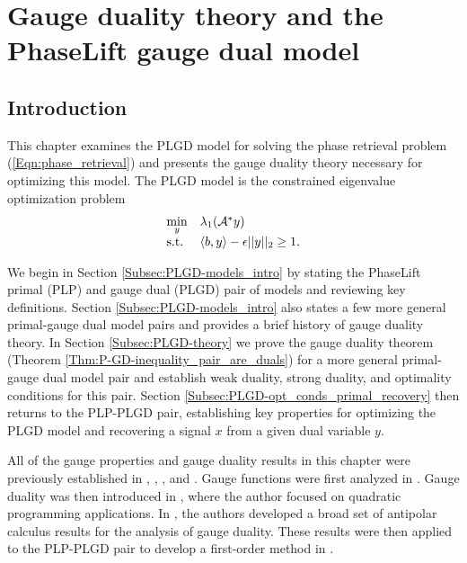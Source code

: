 \chapter{Gauge duality theory and the PhaseLift gauge dual model}	\label{Sec:PLGD}


\section{Introduction} 	\label{Subsec:PLGD-intro}

This chapter examines the PLGD model for solving the phase retrieval problem (\ref{Eqn:phase_retrieval}) and presents the gauge duality theory necessary for optimizing this model.  The PLGD model is the constrained eigenvalue optimization problem
\begin{equation*}
\begin{array}{ll}
	\min\limits_{\substack{y}}
					&	\lambda_1({\mathcal A}^* y)
						\\
	\textnormal{s.t.}
					&	\langle b, y \rangle - \epsilon ||y||_2 \geq 1.
\end{array}
\end{equation*}


We begin in Section \ref{Subsec:PLGD-models_intro} by stating the PhaseLift primal (PLP) and gauge dual (PLGD) pair of models and reviewing key definitions.
Section \ref{Subsec:PLGD-models_intro} also states a few more general primal-gauge dual model pairs and provides a brief history of gauge duality theory.
In Section \ref{Subsec:PLGD-theory} we prove the gauge duality theorem (Theorem \ref{Thm:P-GD-inequality_pair_are_duals}) for a more general primal-gauge dual model pair and establish weak duality, strong duality, and optimality conditions for this pair.
Section \ref{Subsec:PLGD-opt_conds_primal_recovery} then returns to the PLP-PLGD pair, establishing key properties for optimizing the PLGD model and recovering a signal $x$ from a given dual variable $y$.  

All of the gauge properties and gauge duality results in this chapter were previously established in \cite{rockafellar1970convex}, \cite{DBLP:journals/mp/Freund87}, \cite{DBLP:journals/siamjo/FriedlanderMP14}, and \cite{DBLP:journals/siamsc/FriedlanderM16}.  Gauge functions were first analyzed in  \cite{rockafellar1970convex}.  Gauge duality was then introduced in \cite{DBLP:journals/mp/Freund87}, where the author focused on quadratic programming applications.  In \cite{DBLP:journals/siamjo/FriedlanderMP14}, the authors developed a broad set of antipolar calculus results for the analysis of gauge duality.  These results were then applied to the PLP-PLGD pair to develop a first-order method in \cite{DBLP:journals/siamsc/FriedlanderM16}.


